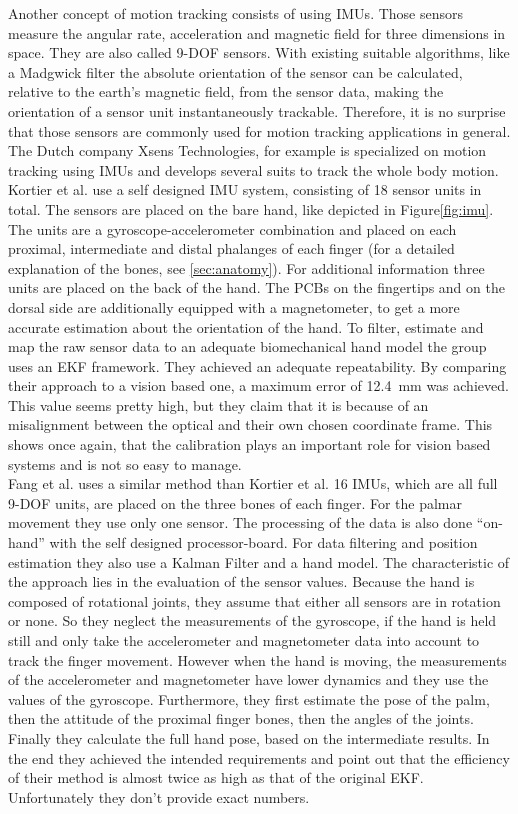 Another concept of motion tracking consists of using \acp{IMU}. Those sensors measure the angular rate, acceleration and magnetic field for three dimensions in space. They are also called 9-\ac{DOF} sensors. With existing suitable algorithms, like a Madgwick filter \cite{madgwick2010efficient} the absolute orientation of the sensor can be calculated, relative to the earth's magnetic field, from the sensor data, making the orientation of a sensor unit instantaneously trackable. Therefore, it is no surprise that those sensors are commonly used for motion tracking applications in general. The Dutch company Xsens Technologies, for example is specialized on motion tracking using \acp{IMU} and develops several suits to track the whole body motion.\\
Kortier et al. use a self designed \ac{IMU} system, consisting of 18 sensor units in total. The sensors are placed on the bare hand, like depicted in Figure\ref{fig:imu}. The units are a gyroscope-accelerometer combination and placed on each proximal, intermediate and distal phalanges of each finger (for a detailed explanation of the bones, see \ref{sec:anatomy}). For additional information three units are placed on the back of the hand. The PCBs on the fingertips and on the dorsal side are additionally equipped with a magnetometer, to get a more accurate estimation about the orientation of the hand. To filter, estimate and map the raw sensor data to an adequate biomechanical hand model the group uses an \ac{EKF} framework. They achieved an adequate repeatability. By comparing their approach to a vision based one, a maximum error of \SI{12.4}{mm} was achieved. This value seems pretty high, but they claim that it is because of an misalignment between the optical and their own chosen coordinate frame. This shows once again, that the calibration plays an important role for vision based systems and is not so easy to manage.\\
Fang et al. uses a similar method than Kortier et al. 16 \acp{IMU}, which are all full 9-\ac{DOF} units, are placed on the three bones of each finger. For the palmar movement they use only one sensor. The processing of the data is also done ``on-hand'' with the self designed processor-board. For data filtering and position estimation they also use a Kalman Filter and a hand model. The characteristic of the approach lies in the evaluation of the sensor values. Because the hand is composed of rotational joints, they assume that either all sensors are in rotation or none. So they neglect the measurements of the gyroscope, if the hand is held still and only take the accelerometer and magnetometer data into account to track the finger movement. However when the hand is moving, the measurements of the accelerometer and magnetometer have lower dynamics and they use the values of the gyroscope. Furthermore, they first estimate the pose of the palm, then the attitude of the proximal finger bones, then the angles of the joints. Finally they calculate the full hand pose, based on the intermediate results. In the end they achieved the intended requirements and point out that the efficiency of their method is almost twice as high as that of the original \ac{EKF}. Unfortunately they don't provide exact numbers.\\
